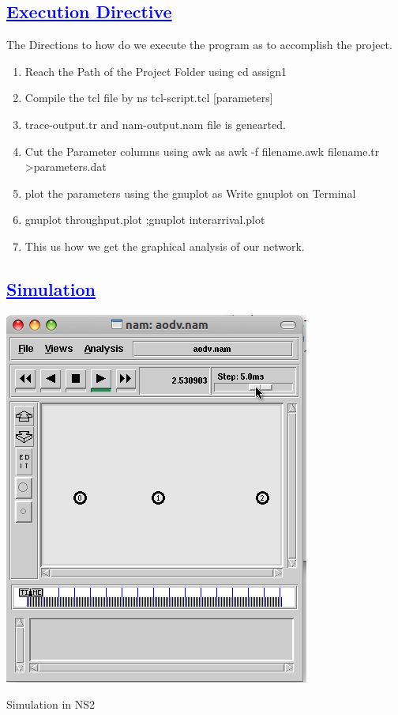 \documentclass[a4paper,12pt]{report}
\begin{document}
\begin{center}
\chapter{\textcolor{blue}{\underline {Execution Directive}}}
\end{center}
The Directions to how do we execute the program as to accomplish the project.
\begin{enumerate} 
\item Reach the Path of the Project Folder using cd assign1
\item Compile the tcl file by  ns tcl-script.tcl [parameters]  
\item trace-output.tr and nam-output.nam file is genearted.
\item Cut the Parameter columns using awk as   awk -f filename.awk filename.tr >parameters.dat 
\item plot the parameters using the gnuplot as  Write gnuplot on Terminal 
\item gnuplot throughput.plot ;gnuplot interarrival.plot
\item This us how we get the graphical analysis of our network.

\end{enumerate}



\begin{center}
\chapter{\textcolor{blue}{\underline {Simulation}}}

 


 \includegraphics[width=11 cm,height=11 cm]{./simulation.png}


Simulation in NS2
\end{center}
\end{document}
